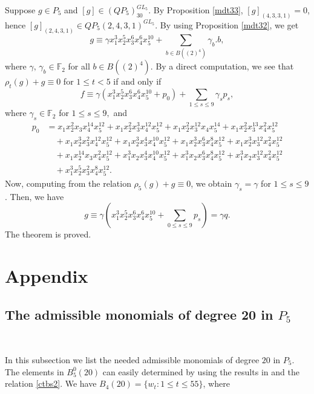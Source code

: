\documentclass[reqno]{amsart}
\theoremstyle{plain}
\theoremstyle{definition}
\theoremstyle{plain}
\theoremstyle{definition}
\numberwithin{equation}{section}
\begin{document}
Suppose $g \in P_5$ and $[g] \in (QP_5)_{30}^{GL_5}$. By Proposition \ref{mdt33}, $[g]_{(4,3,3,1)} = 0$, hence $[g]_{(2,4,3,1)}\in QP_5(2,4,3,1)^{GL_5}$. By using Proposition \ref{mdt32}, we get 
$$g \equiv \gamma x_1^3x_2^5x_3^6x_4^6x_5^{10} + \sum_{b\in B((2)^4)}\gamma_b.b,$$
where $\gamma,\, \gamma_b \in \mathbb F_2$ for all $b\in B((2)^4)$. By a direct computation, we see that $\rho_t(g)+g \equiv 0$ for $1 \leqslant t < 5$ if and only if 
$$ f \equiv \gamma(x_1^3x_2^5x_3^6x_4^6x_5^{10}+p_0) + \sum_{1 \leqslant s \leqslant 9}\gamma_sp_s,$$
where $\gamma_s \in \mathbb F_2$ for $1 \leqslant s \leqslant 9,$ and
\begin{align*}
p_0 &= x_1x_2^{2}x_3x_4^{14}x_5^{12} + x_1x_2^{2}x_3^{3}x_4^{12}x_5^{12} + x_1x_2^{2}x_3^{12}x_4x_5^{14} + x_1x_2^{2}x_3^{13}x_4^{2}x_5^{12}\\ &\quad + x_1x_2^{3}x_3^{2}x_4^{12}x_5^{12} + x_1x_2^{3}x_3^{4}x_4^{10}x_5^{12} + x_1x_2^{3}x_3^{6}x_4^{8}x_5^{12} + x_1x_2^{3}x_3^{12}x_4^{2}x_5^{12}\\ &\quad + x_1x_2^{14}x_3x_4^{2}x_5^{12} + x_1^{3}x_2x_3^{4}x_4^{10}x_5^{12} + x_1^{3}x_2x_3^{6}x_4^{8}x_5^{12} + x_1^{3}x_2x_3^{12}x_4^{2}x_5^{12}\\ &\quad + x_1^{3}x_2^{5}x_3^{2}x_4^{8}x_5^{12}.
\end{align*}
Now, computing from the relation $\rho_5(g) + g \equiv 0$, we obtain $\gamma_s = \gamma$ for $1 \leqslant s \leqslant 9$. Then, we have 
$$g \equiv \gamma\left(x_1^3x_2^5x_3^6x_4^6x_5^{10}+ \sum_{0\leqslant s \leqslant 9}p_s\right) = \gamma q.$$
The theorem is proved.



\section{Appendix}\label{s5}
\setcounter{equation}{0}

\subsection{The admissible monomials of degree 20 in $P_5$}\label{s50}\

\medskip
In this subsection we list the needed admissible monomials of degree $20$ in $P_5$. The elements in
$B_5^0(20)$ can easily determined by using the results in \cite{su5} and the relation \ref{ctbs2}. We have $B_4(20) = \{w_t : 1 \leqslant t \leqslant 55\}$, where
\end{document}
